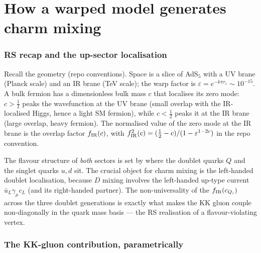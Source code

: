 \documentclass[11pt]{article}
\newcommand{\eps}{\varepsilon}
\theoremstyle{definition}
\begin{document}
\part{How a warped model generates charm mixing}
\label{part:rs}

\section{RS recap and the up-sector localisation}
\label{sec:rsrecap}

Recall the geometry (repo conventions). Space is a slice of AdS$_5$ with a UV
brane (Planck scale) and an IR brane (TeV scale); the warp factor is
$\eps = e^{-k\pi r_c}\sim10^{-15}$. A bulk fermion has a dimensionless bulk mass
$c$ that localises its zero mode: $c>\tfrac12$ peaks the wavefunction at the UV
brane (small overlap with the IR-localised Higgs, hence a light SM fermion),
while $c<\tfrac12$ peaks it at the IR brane (large overlap, heavy fermion). The
normalised value of the zero mode at the IR brane is the overlap factor
$f_{\rm IR}(c)$, with $f_{\rm IR}^2(c) = (\tfrac12-c)/(1-\eps^{1-2c})$ in the
repo convention.

The flavour structure of \emph{both} sectors is set by where the doublet quarks
$Q$ and the singlet quarks $u,d$ sit. The crucial object for charm mixing is the
left-handed doublet localisation, because $D$ mixing involves the left-handed
up-type current $\bar u_L\gamma_\mu c_L$ (and its right-handed partner). The
non-universality of the $f_{\rm IR}(c_{Q_i})$ across the three doublet
generations is exactly what makes the KK gluon couple non-diagonally in the
quark mass basis --- the RS realisation of a flavour-violating vertex.

\section{The KK-gluon contribution, parametrically}
\label{sec:kkgluon}
\end{document}
